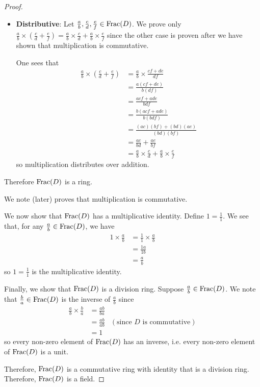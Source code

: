 \begin{proof}
\begin{itemize}
        \item \textbf{Distributive}: Let $\frac ab, \frac cd, \frac ef \in \mathrm{Frac}(D)$. We prove only $\frac ab \times \left(\frac cd + \frac ef\right) = \frac ab \times \frac cd + \frac ab \times \frac ef$ since the other case is proven after we have shown that multiplication is commutative.
        
        One sees that
        \begin{align*}
            \frac ab \times \left(\frac cd + \frac ef\right) &= \frac ab \times \frac{cf + de}{df}\\
            &= \frac{a(cf + de)}{b(df)}\\
            &= \frac{acf + ade}{bdf}\\
            &= \frac{b(acf + ade)}{b(bdf)}\\
            &= \frac{(ac)(bf) + (bd)(ae)}{(bd)(bf)}\\
            &= \frac{ac}{bd} + \frac {ae}{bf}\\
            &= \frac ab \times \frac cd + \frac ab \times \frac ef
        \end{align*}
        so multiplication distributes over addition.
    \end{itemize}
    Therefore $\mathrm{Frac}(D)$ is a ring. 
    
    We note  (later) proves that multiplication is commutative.

    We now show that $\mathrm{Frac}(D)$ has a multiplicative identity. Define $1 = \frac 11$. We see that, for any $\frac ab \in \mathrm{Frac}(D)$, we have
    \begin{align*}
        1 \times \frac ab &= \frac 11 \times \frac ab\\
        &= \frac {1a}{1b}\\
        &= \frac ab
    \end{align*}
    so $1 = \frac 11$ is the multiplicative identity.

    Finally, we show that $\mathrm{Frac}(D)$ is a division ring. Suppose $\frac ab \in \mathrm{Frac}(D)$. We note that $\frac ba \in \mathrm{Frac}(D)$ is the inverse of $\frac ab$ since
    \begin{align*}
        \frac ab \times \frac ba &= \frac{ab}{ba}\\
        &= \frac{ab}{ab} & (\text{since } D \text{ is commutative})\\
        &= 1
    \end{align*}
    so every non-zero element of $\mathrm{Frac}(D)$ has an inverse, i.e. every non-zero element of $\mathrm{Frac}(D)$ is a unit.

    Therefore, $\mathrm{Frac}(D)$ is a commutative ring with identity that is a division ring. Therefore, $\mathrm{Frac}(D)$ is a field.
\end{proof}

